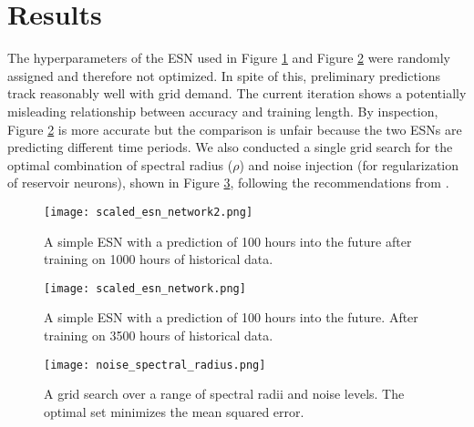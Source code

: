 \section{Results}

The hyperparameters of the \acrshort{ESN} used in Figure \ref{fig:ESN1} and
Figure \ref{fig:ESN2} were randomly assigned and therefore not optimized. In
spite of this, preliminary predictions track reasonably well with grid demand.
The current iteration shows a potentially
misleading relationship between accuracy and training length. By inspection,
Figure \ref{fig:ESN2} is more accurate but the comparison is unfair because
the two ESNs are predicting different time periods.
We also conducted a single grid search for the optimal combination of
spectral radius ($\rho$) and noise injection (for regularization of reservoir
neurons), shown in Figure \ref{fig:gridsearch}, following the recommendations from
\cite{lukosevicius_practical_2012}.

\begin{figure}[h]
  \centering
  \texttt{[image: scaled\_esn\_network2.png]}
  \caption{A simple ESN with a prediction of 100 hours into the future after
  training on 1000 hours of historical data.}
  \label{fig:ESN1}
\end{figure}
\begin{figure}[h]
  \centering
  \texttt{[image: scaled\_esn\_network.png]}
  \caption{A simple ESN with a prediction of 100 hours into the future. After
  training on 3500 hours of historical data.}
  \label{fig:ESN2}
\end{figure}
\begin{figure}[h]
  \centering
  \texttt{[image: noise\_spectral\_radius.png]}
  \caption{A grid search over a range of spectral radii and noise levels. The
  optimal set minimizes the mean squared error.}
  \label{fig:gridsearch}
\end{figure}

